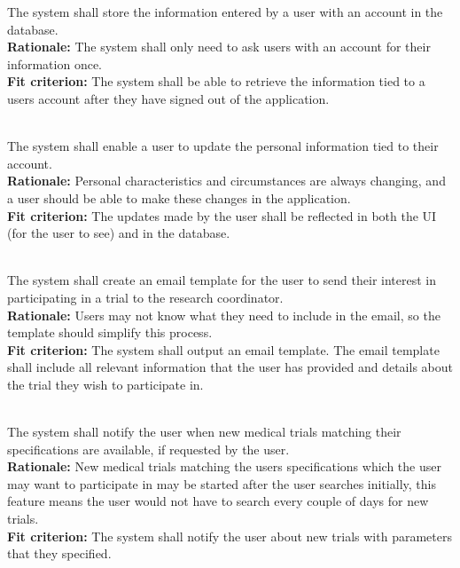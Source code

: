 \documentclass[12pt, titlepage]{article}
\newcounter{FR_Counter}
\begin{document}
The system shall store the information entered by a user with an account in the database.\\
\textbf{Rationale:}
The system shall only need to ask users with an account for their information once.\\
\textbf{Fit criterion:}
The system shall be able to retrieve the information tied to a users account after they have signed out of the application. \\~\\
\addtocounter{FR_Counter}{1}


The system shall enable a user to update the personal information tied to their account.\\
\textbf{Rationale:}
Personal characteristics and circumstances are always changing, and a user should be able to make these changes in the application.\\
\textbf{Fit criterion:}
The updates made by the user shall be reflected in both the UI (for the user to see) and in the database.\\~\\
\addtocounter{FR_Counter}{1}

The system shall create an email template for the user to send their interest in participating in a trial to the research coordinator.\\
\textbf{Rationale:}
Users may not know what they need to include in the email, so the template should simplify this process.\\
\textbf{Fit criterion:}
The system shall output an email template. The email template shall include all relevant information that the user has provided and details about the trial they wish to participate in.\\~\\
\addtocounter{FR_Counter}{1}

The system shall notify the user when new medical trials matching their specifications are available, if requested by the user.\\
\textbf{Rationale:}
New medical trials matching the users specifications which the user may want to participate in may be started after the user searches initially, this feature means the user would not have to search every couple of days for new trials.\\
\textbf{Fit criterion:}
The system shall notify the user about new trials with parameters that they specified.\\~\\
\addtocounter{FR_Counter}{1}
\end{document}
